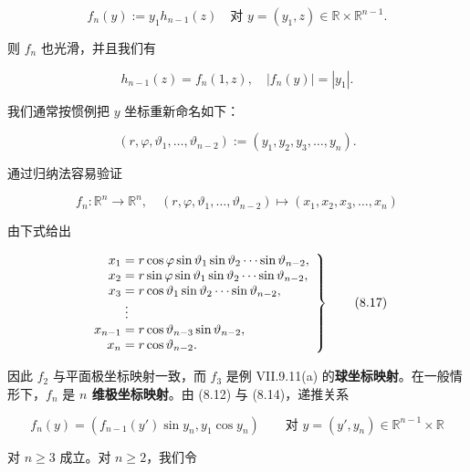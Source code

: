 \begin{equation}
f_{n}(y) := y_{1} h_{n-1}(z) \quad \text{对 } y = (y_{1}, z) \in \mathbb{R} \times \mathbb{R}^{n-1} .\tag{8.14}
\end{equation}

则 $ f_{n} $ 也光滑，并且我们有

\begin{equation}
h_{n-1}(z) = f_{n}(1, z) , \quad |f_{n}(y)| = |y_{1}| .\tag{8.15}
\end{equation}

我们通常按惯例把 $ y $ 坐标重新命名如下：

\[
(r, \varphi, \vartheta_{1}, \dots, \vartheta_{n-2}) := (y_{1}, y_{2}, y_{3}, \dots, y_{n}) .
\]

通过归纳法容易验证

\begin{equation}
f_{n} : \mathbb{R}^{n} \to \mathbb{R}^{n} , \quad (r, \varphi, \vartheta_{1}, \dots, \vartheta_{n-2}) \mapsto (x_{1}, x_{2}, x_{3}, \dots, x_{n})\tag{8.16}
\end{equation}

由下式给出

\begin{equation}
\left. \begin{array}{r@{\;}l} x_{1} & = r\cos\varphi\sin\vartheta_{1}\sin\vartheta_{2}\cdots\sin\vartheta_{n-2}, \\ x_{2} & = r\sin\varphi\sin\vartheta_{1}\sin\vartheta_{2}\cdots\sin\vartheta_{n-2}, \\ x_{3} & = r\cos\vartheta_{1}\sin\vartheta_{2}\cdots\sin\vartheta_{n-2}, \\ & \vdots \\ x_{n-1} & = r\cos\vartheta_{n-3}\sin\vartheta_{n-2}, \\ x_{n} & = r\cos\vartheta_{n-2}. \end{array} \right\}\tag{8.17}
\end{equation}

因此 $ f_{2} $ 与平面极坐标映射一致，而 $ f_{3} $ 是例 VII.9.11(a) 的\textbf{球坐标映射}。在一般情形下，$ f_{n} $ 是 \textbf{$ n $ 维极坐标映射}。由 (8.12) 与 (8.14)，递推关系

\begin{equation}
f_{n}(y) = \left( f_{n-1}(y')\sin y_{n}, y_{1}\cos y_{n} \right) \qquad \text{对 } y = (y', y_{n}) \in \mathbb{R}^{n-1}\times\mathbb{R}\tag{8.18}
\end{equation}

对 $ n \ge 3 $ 成立。对 $ n \ge 2 $，我们令

